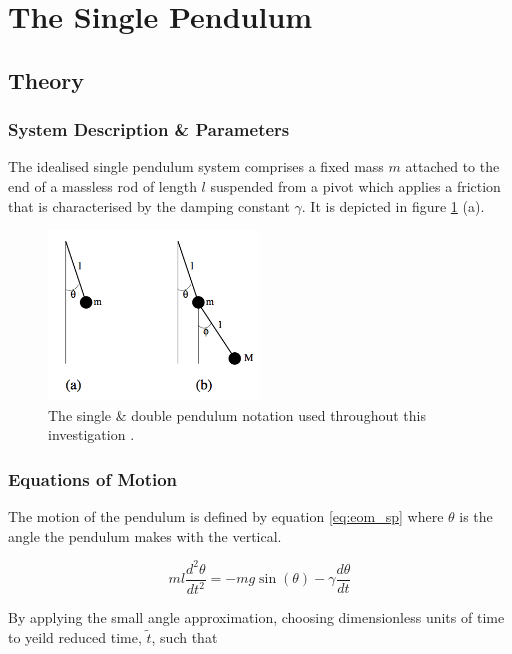 \documentclass[11pt]{article}
\begin{document}
\section{The Single Pendulum}
\subsection{Theory}
\subsubsection*{System Description \& Parameters}
The idealised single pendulum system comprises a fixed mass $m$ attached to the end of a massless rod of length $l$ suspended from a pivot which applies a friction that is characterised by the damping constant $\gamma$. It is depicted in figure \ref{fig:pendulum_diag} (a).

\begin{figure}[h]
	\begin{center}
		\includegraphics[width=0.5\textwidth]{img/sp_dp_diag.png}
		\caption{The single \& double pendulum notation used throughout this investigation \cite{project outline}.}
		\label{fig:pendulum_diag}
	\end{center}
\end{figure}

\subsubsection*{Equations of Motion}
The motion of the pendulum is defined by equation \ref{eq:eom_sp} where $\theta$ is the angle the pendulum makes with the vertical.

\begin{equation} \label{eq:eom_sp}
	ml\frac{d^2 \theta}{dt^2} = -mg\sin(\theta) - \gamma\frac{d\theta}{dt}
\end{equation}

By applying the small angle approximation, choosing dimensionless units of time to yeild reduced time, $\widetilde{t}$, such that
\end{document}
